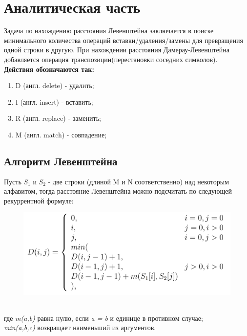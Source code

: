 \documentclass[a4paper, 12pt]{article}
\begin{document}
\section{Аналитическая часть}
\begin{flushleft}
	\hspace*{5mm} Задача по нахождению расстояния Левенштейна заключается в поиске минимального количества операций вставки/удаления/замены для превращения одной строки в другую. При нахождении расстояния Дамерау-Левенштейна добавляется операция транспозиции(перестановки соседних символов).
	\\ {\bf Действия обозначаются так:}
	\begin{enumerate}
		\item D (англ. delete) - удалить;
		\item I (англ. insert) - вставить;
		\item R (англ. replace) - заменить;
		\item M (англ. match) - совпадение;
	\end{enumerate}
	\subsection{Алгоритм Левенштейна}
	\hspace*{5mm} Пусть $S_{1}$ и $S_{2}$ - две строки (длиной M и N соответственно) над некоторым алфавитом, тогда расстояние Левенштейна можно подсчитать по следующей рекуррентной формуле:
	\begin{figure}[h]
		\includegraphics[scale=0.8]{lev}
	\end{figure}
	\\ где {\it m(a,b)} равна нулю, если {\it a = b} и единице в противном случае;
	\\ {\it min(a,b,c)} возвращает наименьший из аргументов.
	\newpage

\end{flushleft}
\end{document}
